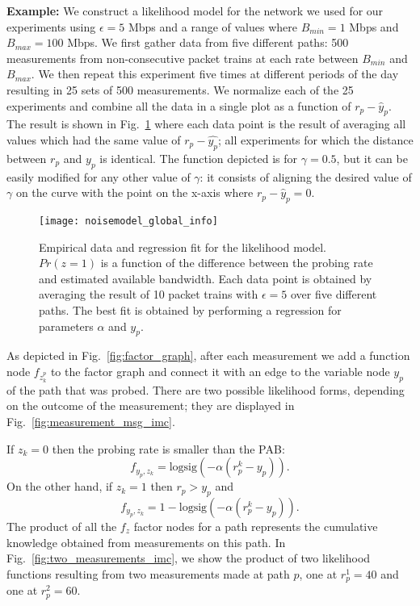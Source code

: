 \documentclass[final,5p,times,twocolumn]{elsarticle}
\begin{document}
{\bf Example:} We construct a likelihood model for the network we used for our experiments using $\epsilon = 5$ Mbps and a range of values where $B_{min} = 1$ Mbps and $B_{max} = 100$ Mbps.  We first gather data from five different paths: 500 measurements from non-consecutive packet trains at each rate between $B_{min}$ and $B_{max}$.  We then repeat this experiment five times at different periods of the day resulting in 25 sets of 500 measurements.  We normalize each of the 25 experiments and combine all the data in a single plot as a function of $r_p - \widehat{y}_p$. The result is shown in Fig.~\ref{fig:likelihood_info} where each data point is the result of averaging all values which had the same value of $r_p - \widehat{y_p}$; all experiments for which the distance between $r_p$ and $y_p$ is identical.  The function depicted is for $\gamma = 0.5$, but it can be easily modified for any other value of $\gamma$: it consists of aligning the desired value of $\gamma$ on the curve with the point on the x-axis where $r_p - \widehat{y}_p = 0$.


\begin{figure}[!h]
	\centering
	\texttt{[image: noisemodel\_global\_info]}
	\caption{Empirical data and regression fit for the likelihood model.  $Pr(z = 1)$ is a function of the difference between the probing rate and estimated available bandwidth.  Each data point is obtained by averaging the result of 10 packet trains with $\epsilon=5$ over five different paths.  The best fit is obtained by performing a regression for parameters $\alpha$ and $y_p$.\label{fig:likelihood_info}}
\end{figure}

As depicted in Fig.~\ref{fig:factor_graph}, after each measurement we add a function node $f_{z_k^p}$ to the factor graph and connect it with an edge to the variable node $y_p$ of the path that was probed.  There are two possible likelihood forms, depending on the outcome of the measurement; they are displayed in Fig.~\ref{fig:measurement_msg_imc}.  

If $z_k = 0$ then the probing rate is smaller than the PAB: $$f_{y_p,z_k} = {\mathrm{logsig}}(-\alpha(r_p^k-y_p)).$$  On the other hand, if $z_k = 1$ then $r_p > y_p$ and $$f_{y_p,z_k} = 1 - {\mathrm{logsig}}(-\alpha(r_p^k-y_p)).$$  The product of all the $f_z$ factor nodes for a path represents the cumulative knowledge obtained from measurements on this path.  In Fig.~\ref{fig:two_measurements_imc}, we show the product of two likelihood functions resulting from two measurements made at path $p$, one at $r_p^1 = 40$ and one at $r_p^2 =60$.  
\end{document}
